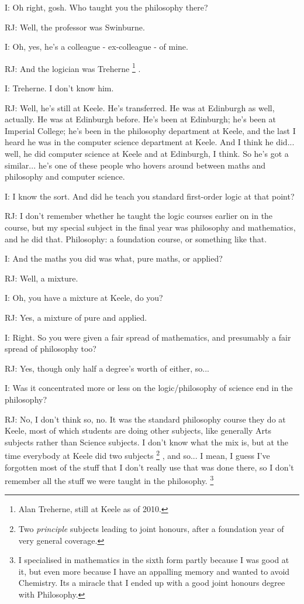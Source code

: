 \documentclass[10pt,titlepage]{book}
\begin{document}
I: Oh right, gosh. Who taught you the philosophy there?

RJ: Well, the professor was Swinburne.

I: Oh, yes, he's a colleague - ex-colleague - of mine.

RJ: And the logician was Treherne%
\footnote{
Alan Treherne, still at Keele as of 2010.}%
.

I: Treherne. I don't know him.

RJ: Well, he's still at Keele. He's transferred. He was at Edinburgh as well, actually. He was at Edinburgh before. He's been at Edinburgh; he's been at Imperial College; he's been in the philosophy department at Keele, and the last I heard he was in the computer science department at Keele. And I think he did... well, he did computer science at Keele and at Edinburgh, I think. So he's got a similar... he's one of these people who hovers around between maths and philosophy and computer science.

I: I know the sort. And did he teach you standard first-order logic at that point?

RJ: I don't remember whether he taught the logic courses earlier on in the course, but my special subject in the final year was philosophy and mathematics, and he did that. Philosophy: a foundation course, or something like that.

I: And the maths you did was what, pure maths, or applied?

RJ: Well, a mixture.

I: Oh, you have a mixture at Keele, do you?

RJ: Yes, a mixture of pure and applied.

I: Right. So you were given a fair spread of mathematics, and presumably a fair spread of philosophy too?

RJ: Yes, though only half a degree's worth of either, so...

I: Was it concentrated more or less on the logic/philosophy of science end in the philosophy?

RJ: No, I don't think so, no. It was the standard philosophy course they do at Keele, most of which students are doing other subjects, like generally Arts subjects rather than Science subjects.
I don't know what the mix is, but at the time everybody at Keele did two subjects%
\footnote{
Two {\it principle} subjects leading to joint honours, after a foundation year of very general coverage.}%
, and so... I mean, I guess I've forgotten most of the stuff that I don't really use that was done there, so I don't remember all the stuff we were taught in the philosophy.%
\footnote{I specialised in mathematics in the sixth form partly because I was good at it, but even more because I have an appalling memory and wanted to avoid Chemistry.
Its a miracle that I ended up with a good joint honours degree with Philosophy.}
\end{document}
